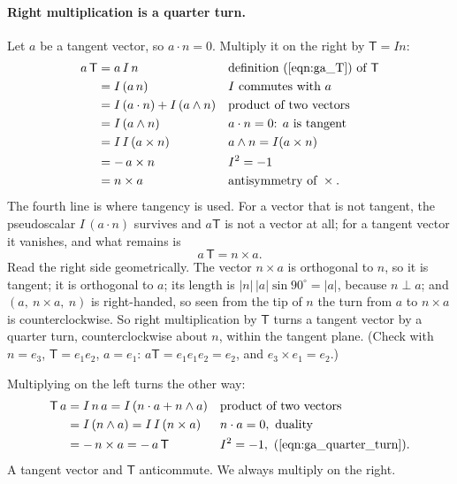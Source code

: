 \paragraph{Right multiplication is a quarter turn.} Let $a$ be a tangent vector, so $a\cdot n = 0$. Multiply it on the right by $\mathsf T = In$:
\begin{align*}
a\,\mathsf T &= a\, I\, n && \text{definition~(\ref{eqn:ga_T}) of } \mathsf T \\
&= I\, (a\, n) && I \text{ commutes with } a \\
&= I\,(a\cdot n) + I\,(a\wedge n) && \text{product of two vectors} \\
&= I\,(a \wedge n) && a \cdot n = 0\text{: } a \text{ is tangent} \\
&= I\, I\,(a\times n) && a\wedge n = I(a\times n) \\
&= -\,a\times n && I^2 = -1 \\
&= n\times a && \text{antisymmetry of } \times .
\end{align*}
The fourth line is where tangency is used. For a vector that is not tangent, the pseudoscalar $I\,(a\cdot n)$ survives and $a\mathsf T$ is not a vector at all; for a tangent vector it vanishes, and what remains is
\begin{equation}
\label{eqn:ga_quarter_turn}
a\, \mathsf T = n \times a .
\end{equation}
Read the right side geometrically. The vector $n\times a$ is orthogonal to $n$, so it is tangent; it is orthogonal to $a$; its length is $|n|\,|a|\sin 90^\circ = |a|$, because $n \perp a$; and $(a,\ n\times a,\ n)$ is right-handed, so seen from the tip of $n$ the turn from $a$ to $n\times a$ is counterclockwise. So right multiplication by $\mathsf T$ turns a tangent vector by a quarter turn, counterclockwise about $n$, within the tangent plane. (Check with $n = e_3$, $\mathsf T = e_1 e_2$, $a = e_1$: $a\mathsf T = e_1 e_1 e_2 = e_2$, and $e_3\times e_1 = e_2$.)

Multiplying on the left turns the other way:
\begin{align*}
\mathsf T\, a &= I\, n\, a = I\,(n\cdot a + n\wedge a) && \text{product of two vectors} \\
&= I\,(n\wedge a) = I\,I\,(n\times a) && n\cdot a = 0,\ \text{duality} \\
&= -\,n\times a = -\,a\,\mathsf T && I^2 = -1,\ (\ref{eqn:ga_quarter_turn}) .
\end{align*}
A tangent vector and $\mathsf T$ anticommute. We always multiply on the right.

